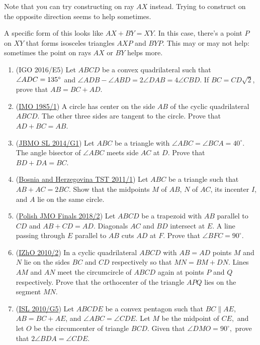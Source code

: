 \documentclass[11pt,paper=letter]{scrartcl}
\begin{document}
Note that you can try constructing on ray $AX$ instead. Trying to construct on the opposite direction seems to help sometimes.

A specific form of this looks like $AX + BY = XY$. In this case, there's a point $P$ on $XY$ that forms isosceles triangles $AXP$ and $BYP$. This may or may not help: sometimes the point on rays $AX$ or $BY$ helps more.

\begin{enumerate}
  \item (IGO 2016/E5) Let $ABCD$ be a convex quadrilateral such that $\angle ADC = 135^\circ$ and $\angle ADB - \angle ABD = 2\angle DAB = 4\angle CBD$. If $BC = CD\sqrt2$, prove that $AB = BC + AD$.

  \item (\href{https://aops.com/community/c6h60782}{IMO 1985/1}) A circle has center on the side $AB$ of the cyclic quadrilateral $ABCD$. The other three sides are tangent to the circle. Prove that $AD+BC=AB$.

  \item (\href{https://aops.com/community/c6h1525185}{JBMO SL 2014/G1}) Let $ABC$ be a triangle with $\angle ABC = \angle BCA = 40^{\circ}$. The angle bisector of $\angle ABC$ meets side $AC$ at $D$. Prove that $BD + DA = BC$.

  \item (\href{https://aops.com/community/c6h406786}{Bosnia and Herzegovina TST 2011/1}) Let $ABC$ be a triangle such that $AB + AC = 2BC$. Show that the midpoints $M$ of $AB$, $N$ of $AC$, its incenter $I$, and $A$ lie on the same circle.

  \item (\href{https://aops.com/community/c6h1632776}{Polish JMO Finals 2018/2}) Let $ABCD$ be a trapezoid with $AB$ parallel to $CD$ and $AB + CD = AD$. Diagonals $AC$ and $BD$ intersect at $E$. A line passing through $E$ parallel to $AB$ cuts $AD$ at $F$. Prove that $\angle BFC = 90^{\circ}$. 

  \item (\href{https://aops.com/community/c6h365230}{IZhO 2010/2}) In a cyclic quadrilateral $ABCD$ with $AB=AD$ points $M$ and $N$ lie on the sides $BC$ and $CD$ respectively so that $MN=BM+DN$. Lines $AM$ and $AN$ meet the circumcircle of $ABCD$ again at points $P$ and $Q$ respectively. Prove that the orthocenter of the triangle $APQ$ lies on the segment $MN$.

  \item (\href{https://aops.com/community/c6h418635}{ISL 2010/G5}) Let $ABCDE$ be a convex pentagon such that $BC \parallel AE$, $AB = BC + AE$, and $\angle ABC = \angle CDE.$ Let $M$ be the midpoint of $CE,$ and let $O$ be the circumcenter of triangle $BCD.$ Given that $\angle DMO = 90^{\circ},$ prove that $2 \angle BDA = \angle CDE$. 
\end{enumerate}
\end{document}

